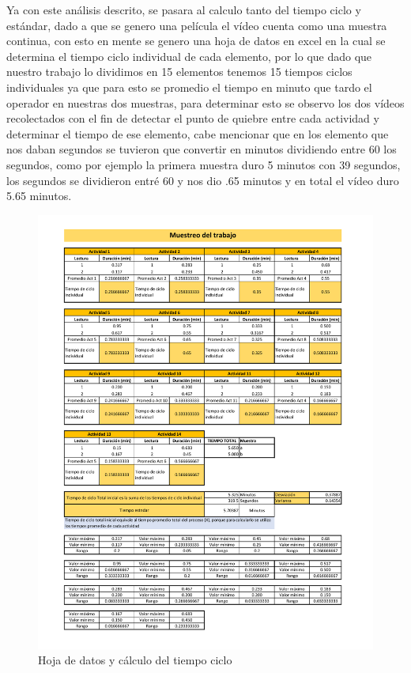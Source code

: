     Ya con este análisis descrito, se pasara al calculo tanto del tiempo ciclo y estándar, dado a que se genero una película el vídeo cuenta como una muestra continua, con esto en mente se genero una hoja de datos en excel en la cual se determina el tiempo ciclo individual de cada elemento, por lo que dado que nuestro trabajo lo dividimos en 15 elementos tenemos 15 tiempos ciclos individuales ya que para esto se promedio el tiempo en minuto que tardo el operador en nuestras dos muestras, para determinar esto se observo los dos vídeos recolectados con el fin de detectar el punto de quiebre entre cada actividad y determinar el tiempo de ese elemento, cabe mencionar que en los elemento que nos daban segundos se tuvieron que convertir en minutos dividiendo entre 60  los segundos, como por ejemplo la primera muestra duro 5 minutos con 39 segundos, los segundos se dividieron entré 60 y nos dio .65 minutos y en total el vídeo duro 5.65 minutos.
    
    \begin{figure}[H]
        \centering
        \includegraphics[trim = {10mm 10mm 10mm 10mm},clip,scale=0.3]{22/Img/tiempoEstandar2Muestras.pdf}
        \caption{Hoja de datos y cálculo del tiempo ciclo}
        \label{fig:tiempoCiclo2}
    \end{figure}
    
